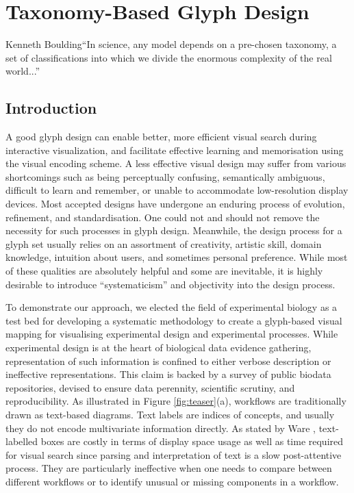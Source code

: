 \chapter{Taxonomy-Based Glyph Design}
\label{chap:glyph-tax}

\begin{chapquote}{Kenneth Boulding}{``In science, any model depends on a pre-chosen taxonomy, a set of classifications into which we divide the enormous complexity of the real world...''}
\end{chapquote}

\section{Introduction}
A good glyph design can enable better, more efficient visual search during interactive visualization, and facilitate effective learning and memorisation using the visual encoding scheme.
A less effective visual design may suffer from various shortcomings such as being perceptually confusing, semantically ambiguous, difficult to learn and remember, or unable to accommodate low-resolution display devices.
Most accepted designs have undergone an enduring process of evolution, refinement, and standardisation.
One could not and should not remove the necessity for such processes in glyph design.
Meanwhile, the design process for a glyph set usually relies on an assortment of creativity, artistic skill, domain knowledge, intuition about users, and sometimes personal preference.
While most of these qualities are absolutely helpful and some are inevitable, it is highly desirable to introduce ``systematicism'' and objectivity into the design process.

To demonstrate our approach, we elected the field of experimental biology as a test bed for developing a systematic methodology to create a glyph-based visual mapping for visualising experimental design and experimental processes.
While experimental design is at the heart of biological data evidence gathering, representation of such information is confined to either verbose description or ineffective representations.
This claim is backed by a survey of public biodata repositories, devised to ensure data perennity, scientific scrutiny, and reproducibility.
As illustrated in Figure \ref{fig:teaser}(a), workflows are traditionally drawn as text-based diagrams.
Text labels are indices of concepts, and usually they do not encode multivariate information directly.
As stated by Ware \cite{ware13}, text-labelled boxes are costly in terms of display space usage as well as time required for visual search since parsing and interpretation of text is a slow post-attentive process.
They are particularly ineffective when one needs to compare between different workflows or to identify unusual or missing components in a workflow.

